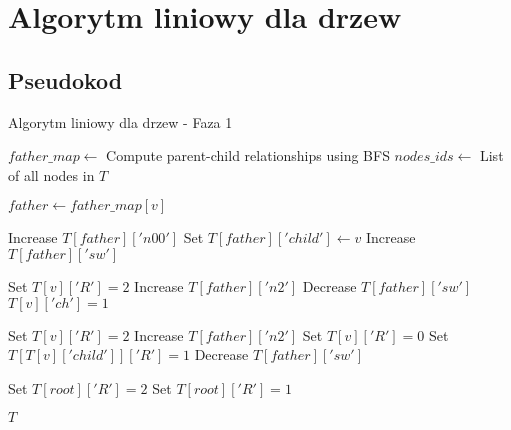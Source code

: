 \section{Algorytm liniowy dla drzew}
\subsection{Pseudokod}
\begin{algorithm}
    \caption*{Algorytm liniowy dla drzew - Faza 1}
    \begin{algorithmic}[1]
            \State $father\_map \gets$ Compute parent-child relationships using BFS
            \State $nodes\_ids \gets$ List of all nodes in $T$
    
                \State $father \gets father\_map[v]$
    
                        \State Increase $T[father]['n00']$
                        \State Set $T[father]['child'] \gets v$
                    \EndIf
                \Else
                        \State Increase $T[father]['sw']$
                    \EndIf
    
                        \State Set $T[v]['R'] = 2$
                            \State Increase $T[father]['n2']$
                                \State Decrease $T[father]['sw']$
                            \EndIf
                        \EndIf
                        \State $T[v]['ch'] = 1$
                    \EndIf
    
                            \State Set $T[v]['R'] = 2$
                                \State Increase $T[father]['n2']$
                            \EndIf
                            \State Set $T[v]['R'] = 0$
                            \State Set $T[T[v]['child']]['R'] = 1$
                                \State Decrease $T[father]['sw']$
                            \EndIf
                        \EndIf
                    \EndIf
                \EndIf
            \EndFor
    
                \State Set $T[root]['R'] = 2$
            \EndIf
                \State Set $T[root]['R'] = 1$
            \EndIf
    
            \State \Return $T$
        \EndFunction
    \end{algorithmic}
    \end{algorithm}
    
